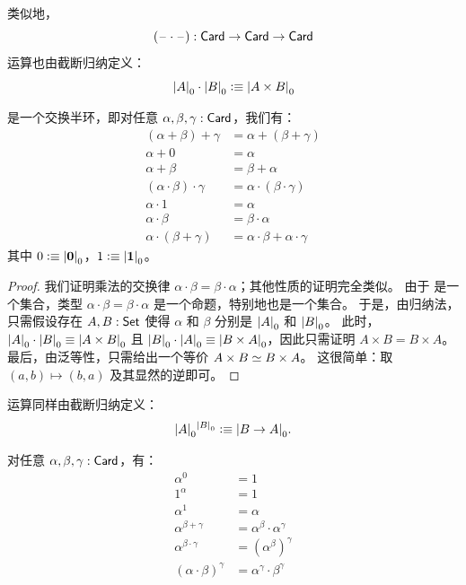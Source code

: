 \begin{defn}
  类似地，
  \[ (\mathord{\hspace{1pt}\text{--}\hspace{1pt}}\cdot\mathord{\hspace{1pt}\text{--}\hspace{1pt}}) : \mathsf{Card} \to \mathsf{Card} \to \mathsf{Card} \]
  运算也由截断归纳定义：
  \[ \mathopen{}\left|A\right|_{0}^{}\mathclose{} \cdot \mathopen{}\left|B\right|_{0}^{}\mathclose{} \vcentcolon\equiv \mathopen{}\left|A\times B\right|_{0}^{}\mathclose{} \]
\end{defn}

\begin{lem}\label{card:semiring}
  \card 是一个交换半环，即对任意 $\alpha,\beta,\gamma:\mathsf{Card}$，我们有：
  \begin{align*}
    (\alpha+\beta)+\gamma &= \alpha+(\beta+\gamma)\\
    \alpha+0 &= \alpha\\
    \alpha + \beta &= \beta + \alpha\\
    (\alpha \cdot \beta) \cdot \gamma &= \alpha \cdot (\beta\cdot\gamma)\\
    \alpha \cdot 1 &= \alpha\\
    \alpha\cdot\beta &= \beta\cdot\alpha\\
    \alpha\cdot(\beta+\gamma) &= \alpha\cdot\beta + \alpha\cdot\gamma
  \end{align*}
  其中 $0 \vcentcolon\equiv \mathopen{}\left|\mathbf{0}\right|_{0}^{}\mathclose{}$，$1\vcentcolon\equiv\mathopen{}\left|\mathbf{1}\right|_{0}^{}\mathclose{}$。
\end{lem}

\begin{proof}
  我们证明乘法的交换律 $\alpha\cdot\beta = \beta\cdot\alpha$；其他性质的证明完全类似。
  由于 \card 是一个集合，类型 $\alpha\cdot\beta = \beta\cdot\alpha$ 是一个命题，特别地也是一个集合。
  于是，由归纳法，只需假设存在 $A,B:\mathsf{Set}$ 使得 $\alpha$ 和 $\beta$ 分别是 $\mathopen{}\left|A\right|_{0}^{}\mathclose{}$ 和 $\mathopen{}\left|B\right|_{0}^{}\mathclose{}$。
  此时，$\mathopen{}\left|A\right|_{0}^{}\mathclose{}\cdot \mathopen{}\left|B\right|_{0}^{}\mathclose{} \equiv \mathopen{}\left|A\times B\right|_{0}^{}\mathclose{}$ 且 $\mathopen{}\left|B\right|_{0}^{}\mathclose{}\cdot\mathopen{}\left|A\right|_{0}^{}\mathclose{} \equiv \mathopen{}\left|B\times A\right|_{0}^{}\mathclose{}$，因此只需证明 $A\times B = B\times A$。
  最后，由泛等性，只需给出一个等价 $A\times B \simeq B\times A$。
  这很简单：取 $(a,b) \mapsto (b,a)$ 及其显然的逆即可。
\end{proof}

\begin{defn}
  运算同样由截断归纳定义：
  \[ \mathopen{}\left|A\right|_{0}^{}\mathclose{}^{\mathopen{}\left|B\right|_{0}^{}\mathclose{}} \vcentcolon\equiv \mathopen{}\left|B\to A\right|_{0}^{}\mathclose{}. \]
\end{defn}

\begin{lem}\label{card:exp}
  对任意 $\alpha,\beta,\gamma:\mathsf{Card}$，有：
  \begin{align*}
    \alpha^0 &= 1\\
    1^\alpha &= 1\\
    \alpha^1 &= \alpha\\
    \alpha^{\beta+\gamma} &= \alpha^\beta \cdot \alpha^\gamma\\
    \alpha^{\beta\cdot \gamma} &= (\alpha^{\beta})^\gamma\\
    (\alpha\cdot\beta)^\gamma &= \alpha^\gamma \cdot \beta^\gamma
  \end{align*}
\end{lem}

